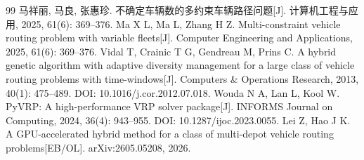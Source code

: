 \documentclass{setp-new}
\begin{document}
\begin{thebibliography}{99}
 马祥丽, 马良, 张惠珍. 不确定车辆数的多约束车辆路径问题[J]. 计算机工程与应用, 2025, 61(6): 369--376. Ma X L, Ma L, Zhang H Z. Multi-constraint vehicle routing problem with variable fleets[J]. Computer Engineering and Applications, 2025, 61(6): 369--376.
 Vidal T, Crainic T G, Gendreau M, Prins C. A hybrid genetic algorithm with adaptive diversity management for a large class of vehicle routing problems with time-windows[J]. Computers \& Operations Research, 2013, 40(1): 475--489. DOI: 10.1016/j.cor.2012.07.018.
 Wouda N A, Lan L, Kool W. PyVRP: A high-performance VRP solver package[J]. INFORMS Journal on Computing, 2024, 36(4): 943--955. DOI: 10.1287/ijoc.2023.0055.
 Lei Z, Hao J K. A GPU-accelerated hybrid method for a class of multi-depot vehicle routing problems[EB/OL]. arXiv:2605.05208, 2026.
\end{thebibliography}
\end{document}
